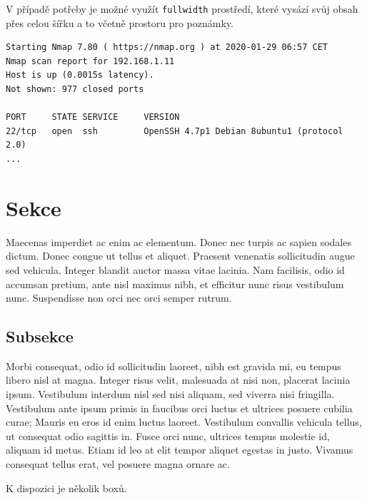\documentclass{skripta}
\begin{document}
V případě potřeby je možné využít {\tt fullwidth} prostředí, které vysází svůj obsah přes celou šířku a to včetně prostoru pro poznámky.

\begin{fullwidth}
\begin{code}
\begin{lstlisting}
Starting Nmap 7.80 ( https://nmap.org ) at 2020-01-29 06:57 CET
Nmap scan report for 192.168.1.11
Host is up (0.0015s latency).
Not shown: 977 closed ports

PORT     STATE SERVICE     VERSION
22/tcp   open  ssh         OpenSSH 4.7p1 Debian 8ubuntu1 (protocol 2.0)
...
\end{lstlisting}
\end{code}
\end{fullwidth}


\section{Sekce}
Maecenas imperdiet ac enim ac elementum. Donec nec turpis ac sapien sodales dictum. Donec congue ut tellus et aliquet. Praesent venenatis sollicitudin augue sed vehicula. Integer blandit auctor massa vitae lacinia. Nam facilisis, odio id accumsan pretium, ante nisl maximus nibh, et efficitur nunc risus vestibulum nunc. Suspendisse non orci nec orci semper rutrum.


\subsection{Subsekce}
Morbi consequat, odio id sollicitudin laoreet, nibh est gravida mi, eu tempus libero nisl at magna. Integer risus velit, malesuada at nisi non, placerat lacinia ipsum. Vestibulum interdum nisl sed nisi aliquam, sed viverra nisi fringilla. Vestibulum ante ipsum primis in faucibus orci luctus et ultrices posuere cubilia curae; Mauris eu eros id enim luctus laoreet. Vestibulum convallis vehicula tellus, ut consequat odio sagittis in. Fusce orci nunc, ultrices tempus molestie id, aliquam id metus. Etiam id leo at elit tempor aliquet egestas in justo. Vivamus consequat tellus erat, vel posuere magna ornare ac.

K dispozici je několik boxů.

\end{document}
